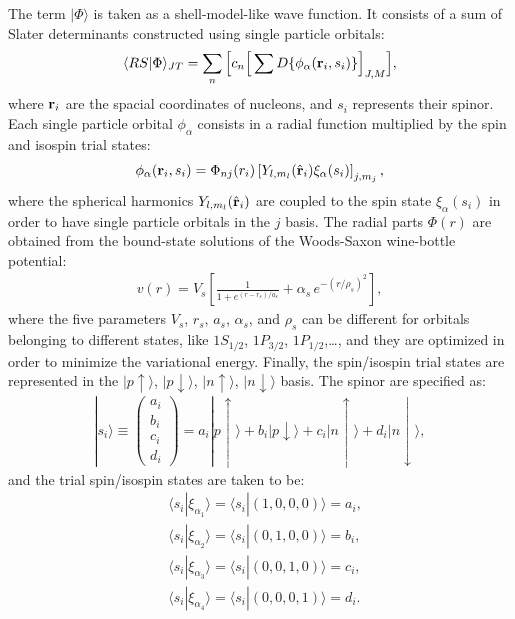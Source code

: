 \documentclass[aps,prc,twocolumn,superscriptaddress,showpacs,floatfix,nofootinbib]{revtex4-1}
\begin{document}
The term $|\Phi\rangle$ is taken as a shell-model-like wave function. 
It consists of a sum of Slater determinants constructed using single particle orbitals:
\begin{align} 
\langle RS|\Phi\rangle_{JT} = \sum_n\Big[c_n\Big[\sum D\{\phi_\alpha(\vb{r}_i,s_i)\}\Big]_{J,M}\Big] ,
\end{align}
where $\vb{r}_i$ are the spacial coordinates of nucleons, and $s_i$ represents their spinor.
Each single particle orbital $\phi_\alpha$ consists in a radial function multiplied by the spin and
isospin trial states:
\begin{align}
\phi_\alpha(\vb{r}_i,s_i)=\Phi_{nj}(r_i)\left[Y_{l,m_l}(\hat{\vb{r}}_i)\xi_\alpha(s_i)\right]_{j,m_j} ,
\end{align}
where the spherical harmonics $Y_{l,m_l}(\hat{\vb{r}}_i)$ are coupled to the spin state $\xi_\alpha(s_i)$
in order to have single particle orbitals in the $j$ basis.
The radial parts $\Phi(r)$ are obtained from the bound-state solutions of the Woods-Saxon 
wine-bottle potential:
\begin{align}
v(r)=V_s\left[\frac{1}{1+e^{(r-r_s)/a_s}}+\alpha_s\,e^{-(r/{\rho_s})^2}\right] ,
\end{align}
where the five parameters $V_s$, $r_s$, $a_s$, $\alpha_s$, and $\rho_s$ can be different for orbitals
belonging to different states, like $1S_{1/2}$, $1P_{3/2}$, $1P_{1/2}$,\ldots, and they are 
optimized in order to minimize the variational energy.
Finally, the spin/isospin trial states are represented in the $|p\uparrow\rangle$, $|p\downarrow\rangle$,
$|n\uparrow\rangle$, $|n\downarrow\rangle$ basis. The spinor are specified as:
\begin{align}
|s_i\rangle \equiv \left(\begin{array}{c} 
a_i \\ b_i \\ c_i \\ d_i
\end{array}\right)
=a_i|p\uparrow\rangle+b_i|p\downarrow\rangle+c_i|n\uparrow\rangle+d_i|n\downarrow\rangle ,
\end{align}
and the trial spin/isospin states are taken to be:
\begin{align}
&\langle s_i|\xi_{\alpha_1}\rangle=\langle s_i|(1,0,0,0)\rangle=a_i,
\nonumber \\
&\langle s_i|\xi_{\alpha_2}\rangle=\langle s_i|(0,1,0,0)\rangle=b_i,
\nonumber \\
&\langle s_i|\xi_{\alpha_3}\rangle=\langle s_i|(0,0,1,0)\rangle=c_i,
\nonumber \\
&\langle s_i|\xi_{\alpha_4}\rangle=\langle s_i|(0,0,0,1)\rangle=d_i .
\end{align}
\end{document}

